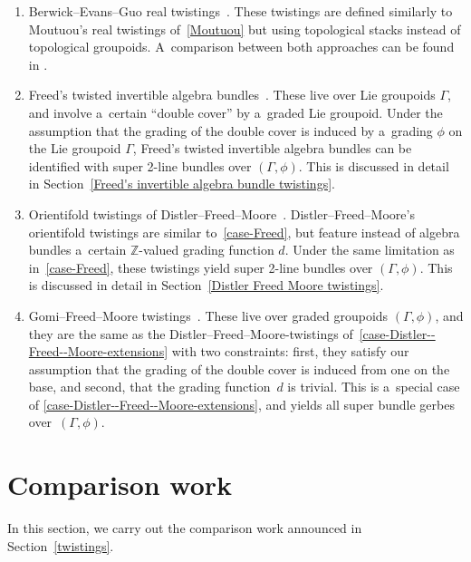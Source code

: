 \documentclass[10pt,a4paper]{amsart}
\numberwithin{equation}{section}
\def\Z {\mathbb{Z}}
\begin{document}
\begin{enumerate}[(1)]
\item
Berwick--Evans--Guo real twistings~\cite{BerwickEvans2024}.
These twistings are defined similarly to Moutuou's real twistings of~\ref{Moutuou} but using topological stacks instead of topological groupoids. A~comparison between both approaches can be found in \cite[Sections~3.4 and~3.5]{BerwickEvans2024}.

\item
\label{case-Freed}
Freed's twisted invertible algebra bundles~\cite{Freed2012a}.
These live over Lie groupoids $\Gamma$, and involve a~certain ``double cover'' by a~graded Lie groupoid. Under the assumption that the grading of the double cover is induced by a~grading $\phi$ on the Lie groupoid $\Gamma$,
Freed's twisted invertible algebra bundles can be identified with super 2-line bundles over $(\Gamma,\phi)$. This is discussed in detail in Section~\ref{Freed's invertible algebra bundle twistings}.

\item
\label{case-Distler--Freed--Moore-extensions}
Orientifold twistings of Distler--Freed--Moore~\cite{Distler2011,distler2010spin,Freed2009Slides}.
Distler--Freed--Moore's orientifold twistings are similar to~\ref{case-Freed}, but feature instead of algebra bundles a~certain $\Z$-valued grading function $d$. Under the same limitation as in~\ref{case-Freed},
these twistings yield super 2-line bundles over $(\Gamma,\phi)$. This is discussed in detail in Section~\ref{Distler Freed Moore twistings}.

\item
Gomi--Freed--Moore twistings~\cite{gomi2021freedmoorektheory}.
These live over graded groupoids $(\Gamma,\phi)$, and they are the same as the Distler--Freed--Moore-twistings of~\ref{case-Distler--Freed--Moore-extensions}
with two constraints: first, they satisfy our assumption that the grading of the double cover is induced from one on the base, and second, that the grading function~$d$ is trivial. This is a~special case of
\ref{case-Distler--Freed--Moore-extensions}, and yields all super bundle gerbes over~$(\Gamma,\phi)$.
\end{enumerate}

\section{Comparison work}\label{section-comparison-work}

In this section, we carry out the comparison work announced in Section~\ref{twistings}.
\end{document}
